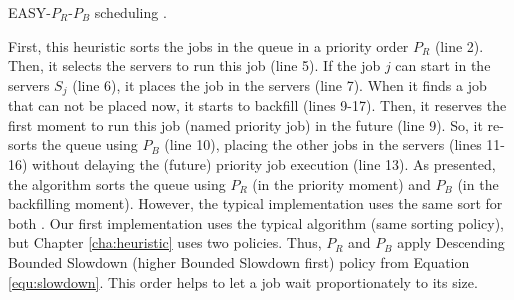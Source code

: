 \IncMargin{1em}
\begin{algorithm}[!htb]
    \LinesNumbered
    \footnotesize
    \SetAlgoLined
    \caption{EASY-$P_{R}$-$P_{B}$ scheduling \cite{lelong2018tuning}.}
    \label{alg:algo_scheduling}
\end{algorithm}
\DecMargin{1em}

First, this heuristic sorts the jobs in the queue in a priority order $P_{R}$ (line 2). Then, it selects the servers to run this job (line 5). If the job $j$ can start in the servers $S_j$ (line 6), it places the job in the servers (line 7). When it finds a job that can not be placed now, it starts to backfill (lines 9-17). Then, it reserves the first moment to run this job (named priority job) in the future (line 9). So, it re-sorts the queue using $P_{B}$ (line 10), placing the other jobs in the servers (lines 11-16) without delaying the (future) priority job execution (line 13). As presented, the algorithm sorts the queue using $P_{R}$ (in the priority moment) and $P_{B}$ (in the backfilling moment). However, the typical implementation uses the same sort for both \cite{lelong2018tuning}. Our first implementation uses the typical algorithm (same sorting policy), but Chapter \ref{cha:heuristic} uses two policies. Thus, $P_{R}$ and $P_{B}$ apply Descending Bounded Slowdown (higher Bounded Slowdown first) policy from Equation \ref{equ:slowdown}. This order helps to let a job wait proportionately to its size.

